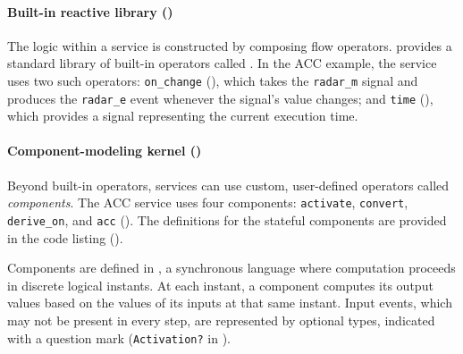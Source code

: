 \paragraph{Built-in reactive library (\GReact)}
The logic within a service is constructed by composing flow operators. \GRust
provides a standard library of built-in operators called \GReact. In the ACC
example, the service uses two such operators: \texttt{on\_change}
(), which takes the \texttt{radar\_m} signal and
produces the \texttt{radar\_e} event whenever the signal's value changes; and
\texttt{time} (), which provides a signal
representing the current execution time.

\paragraph{Component-modeling kernel (\GRSync)}
Beyond built-in operators, services can use custom, user-defined operators called
\emph{components}. The ACC service uses four components: \texttt{activate},
\texttt{convert}, \texttt{derive\_on}, and \texttt{acc}
(). The definitions
for the stateful components are provided in the code listing
().

Components are defined in \GRSync, a synchronous language where computation proceeds
in discrete logical instants. At each instant, a component computes its output values
based on the values of its inputs at that same instant. Input events, which may not
be present in every step, are represented by optional types, indicated with a question
mark (\eg \texttt{Activation?} in ).

